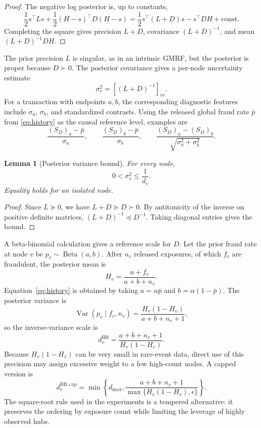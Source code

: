 \documentclass[11pt]{article}
\newtheorem{lemma}[theorem]{Lemma}
\theoremstyle{definition}
\theoremstyle{remark}
\newcommand{\Var}{\operatorname{Var}}
\begin{document}
\begin{proof}
The negative log posterior is, up to constants,
\[
    \frac12s^\top Ls+\frac12(H-s)^\top D(H-s)
    =\frac12s^\top(L+D)s-s^\top DH+\text{const.}
\]
Completing the square gives precision $L+D$, covariance $(L+D)^{-1}$, and mean $(L+D)^{-1}DH$.
\end{proof}

The prior precision $L$ is singular, as in an intrinsic GMRF, but the posterior is proper because $D\succ0$. The posterior covariance gives a per-node uncertainty estimate
\begin{equation}
    \sigma_v^2=[(L+D)^{-1}]_{vv}.
    \label{eq:posterior-var}
\end{equation}
For a transaction with endpoints $a,b$, the corresponding diagnostic features include $\sigma_a$, $\sigma_b$, and standardized contrasts. Using the released global fraud rate $\bar p$ from \eqref{eq:history} as the causal reference level, examples are
\[
    \frac{(S_D)_a-\bar p}{\sigma_a},
    \qquad
    \frac{(S_D)_b-\bar p}{\sigma_b},
    \qquad
    \frac{(S_D)_a-(S_D)_b}{\sqrt{\sigma_a^2+\sigma_b^2}}.
\]

\begin{lemma}[Posterior variance bound]
For every node,
\[
    0<\sigma_v^2\le \frac1{d_v}.
\]
Equality holds for an isolated node.
\end{lemma}

\begin{proof}
Since $L\succeq0$, we have $L+D\succeq D\succ0$. By antitonicity of the inverse on positive definite matrices, $(L+D)^{-1}\preceq D^{-1}$. Taking diagonal entries gives the bound.
\end{proof}

A beta-binomial calculation gives a reference scale for $D$. Let the prior fraud rate at node $v$ be $p_v\sim\operatorname{Beta}(a,b)$. After $n_v$ released exposures, of which $f_v$ are fraudulent, the posterior mean is
\[
    H_v=\frac{a+f_v}{a+b+n_v}.
\]
Equation~\eqref{eq:history} is obtained by taking $a=\alpha\bar p$ and $b=\alpha(1-\bar p)$. The posterior variance is
\[
    \Var(p_v\mid f_v,n_v)=\frac{H_v(1-H_v)}{a+b+n_v+1},
\]
so the inverse-variance scale is
\begin{equation}
    d_v^{\mathrm{BB}}=\frac{a+b+n_v+1}{H_v(1-H_v)}.
    \label{eq:eb-d}
\end{equation}
Because $H_v(1-H_v)$ can be very small in rare-event data, direct use of this precision may assign excessive weight to a few high-count nodes. A capped version is
\begin{equation}
    d_v^{\mathrm{BB,cap}}=\min\left\{d_{\max},\frac{a+b+n_v+1}{\max\{H_v(1-H_v),\epsilon\}}\right\}.
    \label{eq:eb-cap}
\end{equation}
The square-root rule used in the experiments is a tempered alternative: it preserves the ordering by exposure count while limiting the leverage of highly observed hubs.
\end{document}
